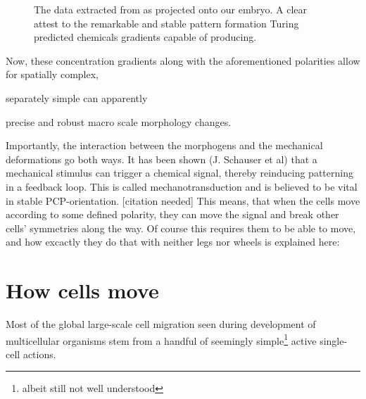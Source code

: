 \begin{figure}[H]
    \centering
    \caption{The data extracted from  as projected onto our embryo. A clear attest to the remarkable and stable pattern formation Turing predicted chemicals gradients capable of producing.}
    \label{fig:MorphogenMap}
\end{figure}


Now, these concentration gradients along with the aforementioned polarities allow for spatially complex, 

separately simple can apparently 

precise and robust macro scale morphology changes.


Importantly, the interaction between the morphogens and the mechanical deformations go both ways. It has been shown (J. Schauser et al) that a mechanical stimulus can trigger a chemical signal, thereby reinducing patterning in a feedback loop. This is called mechanotransduction and is believed to be vital in stable PCP-orientation. [citation needed] This means, that when the cells move according to some defined polarity, they can move the signal and break other cells' symmetries along the way.  Of course this requires them to be able to move, and how excactly they do that with neither legs nor wheels is explained here: 


\section{How cells move}

Most of the global large-scale cell migration seen during development of multicellular organisms stem from a handful of seemingly simple\footnote{albeit still not well understood} active single-cell actions.\cite{walck2014cell}\\


